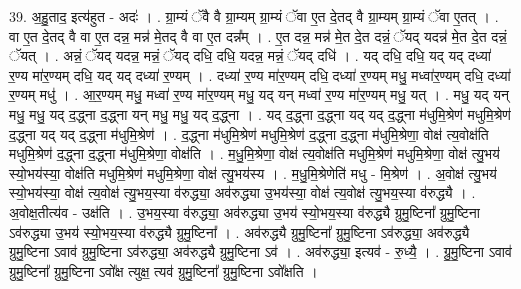 \documentclass[17pt]{extarticle}
\begin{document}
39. अ॒हु॒ताद॒ इत्य॑हुत - अदः॑ । . ग्रा॒म्यं ॅवै वै ग्रा॒म्यम् ग्रा॒म्यं ॅवा ए॒त दे॒तद् वै ग्रा॒म्यम् ग्रा॒म्यं ॅवा ए॒तत् । . वा ए॒त दे॒तद् वै वा ए॒त दन्न॒ मन्न॑ मे॒तद् वै वा ए॒त दन्न᳚म् । . ए॒त दन्न॒ मन्न॑ मे॒त दे॒त दन्नं॒ ॅयद् यदन्न॑ मे॒त दे॒त दन्नं॒ ॅयत् । . अन्नं॒ ॅयद् यदन्न॒ मन्नं॒ ॅयद् दधि॒ दधि॒ यदन्न॒ मन्नं॒ ॅयद् दधि॑ । . यद् दधि॒ दधि॒ यद् यद् दध्या॑ र॒ण्य मा॑र॒ण्यम् दधि॒ यद् यद् दध्या॑ र॒ण्यम् । . दध्या॑ र॒ण्य मा॑र॒ण्यम् दधि॒ दध्या॑ र॒ण्यम् मधु॒ मध्वा॑र॒ण्यम् दधि॒ दध्या॑ र॒ण्यम् मधु॑ । . आ॒र॒ण्यम् मधु॒ मध्वा॑ र॒ण्य मा॑र॒ण्यम् मधु॒ यद् यन् मध्वा॑ र॒ण्य मा॑र॒ण्यम् मधु॒ यत् । . मधु॒ यद् यन् मधु॒ मधु॒ यद् द॒द्ध्ना द॒द्ध्ना यन् मधु॒ मधु॒ यद् द॒द्ध्ना । . यद् द॒द्ध्ना द॒द्ध्ना यद् यद् द॒द्ध्ना म॑धुमि॒श्रेण॑ मधुमि॒श्रेण॑ द॒द्ध्ना यद् यद् द॒द्ध्ना म॑धुमि॒श्रेण॑ । . द॒द्ध्ना म॑धुमि॒श्रेण॑ मधुमि॒श्रेण॑ द॒द्ध्ना द॒द्ध्ना म॑धुमि॒श्रेणा॒ वोक्ष॑ त्य॒वोक्ष॑ति मधुमि॒श्रेण॑ द॒द्ध्ना द॒द्ध्ना म॑धुमि॒श्रेणा॒ वोक्ष॑ति । . म॒धु॒मि॒श्रेणा॒ वोक्ष॑ त्य॒वोक्ष॑ति मधुमि॒श्रेण॑ मधुमि॒श्रेणा॒ वोक्ष॑ त्यु॒भय॑ स्यो॒भय॑स्या॒ वोक्ष॑ति मधुमि॒श्रेण॑ मधुमि॒श्रेणा॒ वोक्ष॑ त्यु॒भय॑स्य । . म॒धु॒मि॒श्रेणेति॑ मधु - मि॒श्रेण॑ । . अ॒वोक्ष॑ त्यु॒भय॑ स्यो॒भय॑स्या॒ वोक्ष॑ त्य॒वोक्ष॑ त्यु॒भय॒स्या व॑रुद्ध्या॒ अव॑रुद्ध्या उ॒भय॑स्या॒ वोक्ष॑ त्य॒वोक्ष॑ त्यु॒भय॒स्या व॑रुद्ध्यै । . अ॒वोक्ष॒तीत्य॑व - उक्ष॑ति । . उ॒भय॒स्या व॑रुद्ध्या॒ अव॑रुद्ध्या उ॒भय॑ स्यो॒भय॒स्या व॑रुद्ध्यै ग्रुमु॒ष्टिना᳚ ग्रुमु॒ष्टिना ऽव॑रुद्ध्या उ॒भय॑ स्यो॒भय॒स्या व॑रुद्ध्यै ग्रुमु॒ष्टिना᳚ । . अव॑रुद्ध्यै ग्रुमु॒ष्टिना᳚ ग्रुमु॒ष्टिना ऽव॑रुद्ध्या॒ अव॑रुद्ध्यै ग्रुमु॒ष्टिना ऽवाव॑ ग्रुमु॒ष्टिना ऽव॑रुद्ध्या॒ अव॑रुद्ध्यै ग्रुमु॒ष्टिना ऽव॑ । . अव॑रुद्ध्या॒ इत्यव॑ - रु॒ध्यै॒ । . ग्रु॒मु॒ष्टिना ऽवाव॑ ग्रुमु॒ष्टिना᳚ ग्रुमु॒ष्टिना ऽवो᳚क्ष त्युक्ष॒ त्यव॑ ग्रुमु॒ष्टिना᳚ ग्रुमु॒ष्टिना ऽवो᳚क्षति । \newline
\end{document}
